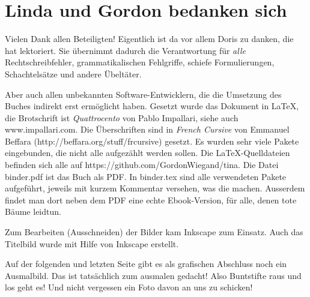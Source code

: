 \chapter*{\large\textsf{Linda und Gordon bedanken sich}}
        \thispagestyle{empty}

Vielen Dank allen Beteiligten! Eigentlich ist da vor allem Doris zu danken, die hat lektoriert. Sie übernimmt dadurch die Verantwortung für \emph{alle} Rechtschreibfehler, grammatikalischen Fehlgriffe, schiefe Formulierungen, Schachtelsätze und andere Übeltäter.

Aber auch allen unbekannten Software-Entwicklern, die die Umsetzung des Buches
indirekt erst ermöglicht haben. Gesetzt wurde das Dokument in \LaTeX, die
Brotschrift ist \emph{Quattrocento} von Pablo Impallari, siehe auch
www.impallari.com. Die Überschriften sind in \emph{French Cursive} von Emmanuel
Beffara (http://beffara.org/stuff/frcursive) gesetzt. Es wurden sehr viele
Pakete eingebunden, die nicht alle aufgezählt werden sollen. Die
\LaTeX-Quelldateien befinden sich alle auf
https://github.com/GordonWiegand/tina. Die Datei binder.pdf ist das Buch als
PDF. In binder.tex sind alle verwendeten Pakete aufgeführt, jeweils mit kurzem
Kommentar versehen, was die machen. Ausserdem findet man dort neben dem PDF
eine echte Ebook-Version, für alle, denen tote Bäume leidtun.


Zum Bearbeiten (Ausschneiden) der Bilder kam Inkscape zum Einsatz. Auch das Titelbild wurde mit Hilfe von Inkscape erstellt. 
        \thispagestyle{empty}

Auf der folgenden und letzten Seite gibt es als grafischen Abschluss noch ein Ausmalbild. Das ist tatsächlich zum ausmalen gedacht! Also Buntstifte raus und los geht es! Und nicht vergessen ein Foto davon an uns zu schicken!


